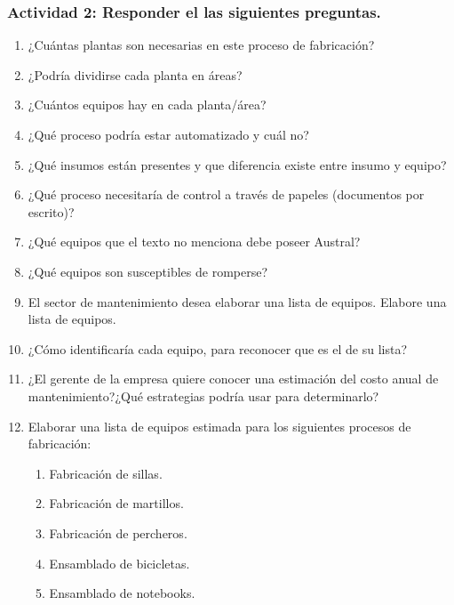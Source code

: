 \documentclass[a4paper]{article}
\begin{document}
\subsubsection{Actividad 2: Responder el las siguientes preguntas.}
\begin{enumerate}
\large
    \item ¿Cuántas plantas son necesarias en este proceso de fabricación? \item ¿Podría dividirse cada planta en áreas?
    \item ¿Cuántos equipos hay en cada planta/área?
    \item ¿Qué proceso podría estar automatizado y cuál no?
    \item ¿Qué insumos están presentes y que diferencia existe entre insumo y equipo?
    \item ¿Qué proceso necesitaría de control a través de papeles (documentos por escrito)?
    \item ¿Qué equipos que el texto no menciona debe poseer Austral?
    \item ¿Qué equipos son susceptibles de romperse?
    \item El sector de mantenimiento desea elaborar una lista de equipos. Elabore una lista de equipos.
    \item ¿Cómo identificaría cada equipo, para reconocer que es el de su lista?
    \item ¿El gerente de la empresa quiere conocer una estimación del costo anual de mantenimiento?¿Qué estrategias podría usar para determinarlo?
    \item Elaborar una lista de equipos estimada para los siguientes procesos de fabricación:
    \begin{enumerate}
        \item Fabricación de sillas.
        \item Fabricación de martillos.
        \item Fabricación de percheros. 
        \item Ensamblado de bicicletas.
        \item Ensamblado de notebooks.
    \end{enumerate}
    
\end{enumerate}
\end{document}
